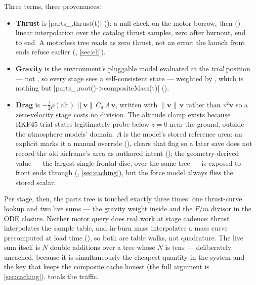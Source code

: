 Three terms, three provenances:

\begin{itemize}
\item \textbf{Thrust} is \cppinline|parts_.thrust(t)| (): a
      null-check on the motor borrow, then 
      () --- linear interpolation over the catalog thrust
      samples, zero after burnout,  end to end. A motorless tree reads as zero
      thrust, not an error; the launch front ends refuse earlier
      (, \cref{sec:cli}).
\item \textbf{Gravity} is the environment's pluggable model evaluated at the \emph{trial}
      position --- not , so every stage sees a self-consistent state ---
      weighted by , which is nothing but
      \cppinline|parts_.root()->compositeMass(t)| ().
\item \textbf{Drag} is $-\tfrac{1}{2}\rho(\mathrm{alt})\,\lVert\mathbf v\rVert\,C_d\,A\,\mathbf v$,
      written with $\lVert\mathbf v\rVert\,\mathbf v$ rather than $v^2\hat{\mathbf v}$ so a
      zero-velocity stage costs no division. The altitude clamp exists because RKF45 trial states
      legitimately probe below $z = 0$ near the ground, outside the atmosphere models' domain.
      $A$ is the model's stored reference area: an explicit  marks it a
      manual override (),  clears that
      flag so a later save does not record the old airframe's area as authored intent
      (); the geometry-derived value --- the largest
      single frontal disc,  over the same tree --- is exposed
      to front ends through 
      (, \cref{sec:caching}), but the force model always
      flies the stored scalar.
\end{itemize}

Per stage, then, the parts tree is touched exactly three times: one thrust-curve lookup and two
live  sums --- the gravity weight inside  and the $F/m$
divisor in the ODE closure. Neither motor query does real work at stage cadence: thrust
interpolates the sample table, and in-burn mass interpolates a mass curve precomputed at load
time (), so both are table walks, not quadrature. The live
sum itself is $N$ double additions over a tree whose $N$ is tens --- deliberately uncached,
because it is simultaneously the cheapest quantity in the system and the key that keeps the
composite cache honest (the full argument is \cref{sec:caching}). 
totals the traffic.

